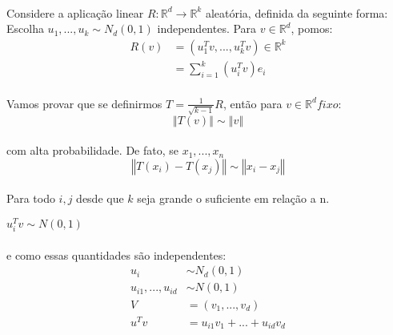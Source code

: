 \paragraph{}Considere a aplicação linear $R \colon \mathbb{R}^d \to \mathbb{R}^k$ aleatória, definida da seguinte forma: Escolha $u_1,...,u_k \sim N_d(0,1)$ independentes. Para $v \in \mathbb{R}^d$, pomos:
\begin{equation*}
    \begin{split}
    R(v) &= (u_1^Tv,...,u_k^Tv) \in \mathbb{R}^k\\
         &= \sum\limits_{i=1}^k (u_i^Tv)e_i
    \end{split}
\end{equation*}
\paragraph{}Vamos provar que se definirmos $T = \frac{1}{\sqrt{k-1}}R$, então para $v \in \mathbb{R}^d fixo$:
\begin{equation*}
    \left\Vert T(v) \right\Vert \sim \left\Vert v \right\Vert
\end{equation*}
\paragraph{}com alta probabilidade. De fato, se $x_1,...,x_n$
\begin{equation*}
    \left\Vert T(x_i) - T(x_j) \right\Vert \sim \left\Vert x_i - x_j \right\Vert
\end{equation*}
\paragraph{}Para todo $i,j$ desde que $k$ seja grande o suficiente em relação a n.
\begin{fato}
$u_i^Tv \sim N(0,1)$
\end{fato}
\paragraph{}e como essas quantidades são independentes:
\begin{equation*}
    \begin{split}
    u_i &\sim N_d(0,1)\\
    u_{i1},...,u_{id} &\sim N(0,1)\\
    V &= (v_1,...,v_d)\\
    u^Tv &= u_{i1}v_1 +...+u_{id}v_d
    \end{split}
\end{equation*}
